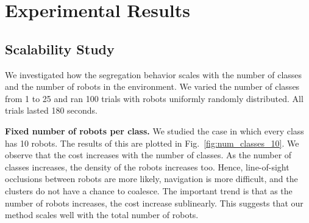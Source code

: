 \documentclass[letterpaper, 10 pt, conference]{ieeeconf}
\newtheorem{theorem}{Theorem}
\newcommand{\myparagraph}[1]{\textbf{#1.}}
\begin{document}






\section{Experimental Results}

\subsection{Scalability Study} \label{section:scalability}

We investigated how the segregation behavior scales with the number of classes
and the number of robots in the environment. We varied the number of classes
from 1 to 25 and ran 100 trials with robots uniformly randomly distributed. All
trials lasted 180 seconds.

\myparagraph{Fixed number of robots per class}
We studied the case in which every class has 10 robots. The results of this are
plotted in Fig.~\ref{fig:num_classes_10}. We observe that the cost increases
with the number of classes. As the number of classes increases,
the density of the robots increases too. Hence, line-of-sight occlusions between robots are more likely,
navigation is more difficult, and the clusters do not have a chance to coalesce.
The important trend is that as the number of robots increases, the cost increase sublinearly.
This suggests that our method scales well with the total number of robots.
\end{document}
